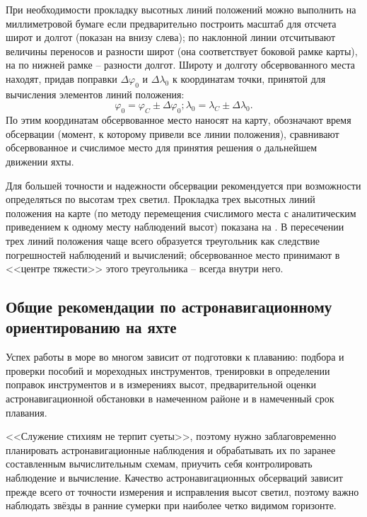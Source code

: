 При необходимости прокладку высотных линий положений можно выполнить
на миллиметровой бумаге если предварительно построить масштаб для
отсчета широт и долгот (показан на  внизу слева); по
наклонной линии отсчитывают величины переносов и разности широт (она
соответствует боковой рамке карты), на по нижней рамке \--- разности
долгот. Широту и долготу обсервованного места находят, придав поправки
$\Delta \varphi_0$ и $\Delta \lambda_0$ к координатам точки, принятой
для вычисления элементов линий положения:
%
\begin{equation}
  \label{eq:77}
  \varphi_0 = \varphi_C \pm \Delta \varphi_0;
  \lambda_0 = \lambda_C \pm \Delta \lambda_0.
\end{equation}
%
По этим координатам обсервованное место наносят на карту, обозначают
время обсервации (момент, к которому привели все линии положения),
сравнивают обсервованное и счислимое место для принятия решения о
дальнейшем движении яхты.

Для большей точности и надежности обсервации рекомендуется при
возможности определяться по высотам трех светил. Прокладка трех
высотных линий положения на карте (по методу перемещения счислимого
места с аналитическим приведением к одному месту наблюдений высот)
показана на . В пересечении трех линий положения чаще всего
образуется треугольник как следствие погрешностей наблюдений и
вычислений; обсервованное место принимают в <<центре тяжести>> этого
треугольника \--- всегда внутри него.

\subsection{Общие рекомендации по астронавигационному ориентированию на яхте}

Успех работы в море во многом зависит от подготовки к плаванию:
подбора и проверки пособий и мореходных инструментов, тренировки в
определении поправок инструментов и в измерениях высот,
предварительной оценки астронавигационной обстановки в намеченном
районе и в намеченный срок плавания.

<<Служение стихиям не терпит суеты>>, поэтому нужно заблаговременно
планировать астронавигационные наблюдения и обрабатывать их по заранее
составленным вычислительным схемам, приучить себя контролировать
наблюдение и вычисление. Качество астронавигационных обсерваций
зависит прежде всего от точности измерения и исправления высот светил,
поэтому важно наблюдать звёзды в ранние сумерки при наиболее четко
видимом горизонте.

